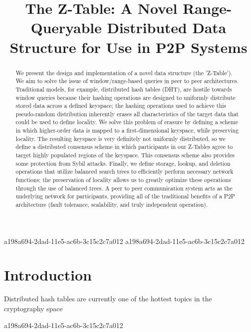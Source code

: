 \documentclass[12pt]{article}
\title{The Z-Table: A Novel Range-Queryable Distributed Data Structure for Use in P2P Systems}
\begin{document}
\maketitle

\begin{abstract}
We present the design and implementation of a novel data structure (the 'Z-Table'). We aim to solve the issue of window/range-based queries in peer to peer architectures. Traditional models, for example,  distributed hash tables (DHT), are hostile towards window queries because their hashing operations are designed to uniformly distribute stored data across a defined keyspace; the hashing operations used to achieve this pseudo-random distribution inherently erases all characteristics of the target data that could be used to define locality. We solve this problem of erasure by defining a scheme in which higher-order data is mapped to a first-dimensional keyspace, while preserving locality. The resulting keyspace is very definitely not uniformly distributed, so we define a distributed consensus scheme in which participants in our Z-Tables agree to target highly populated regions of the keyspace. This consensus scheme also provides some protection from Sybil attacks. Finally, we define storage, lookup, and deletion operations that utilize balanced search trees to efficiently perform necessary network functions; the preservation of locality allows us to greatly optimize these operations through the use of balanced trees. A peer to peer communication system acts as the underlying network for participants, providing all of the traditional benefits of a P2P architecture (fault tolerance, scalability, and truly independent operation).
\end{abstract}

a198a694-2dad-11e5-ac6b-3c15c2c7a012
a198a694-2dad-11e5-ac6b-3c15c2c7a012\newpage
\section{Introduction}
Distributed hash tables are currently one of the hottest topics in the cryptography space~\cite{Stoica:2001dj,Rowstron:2001ea,Ratnasamy:2001wn}

a198a694-2dad-11e5-ac6b-3c15c2c7a012\printbibliography
\end{document}
